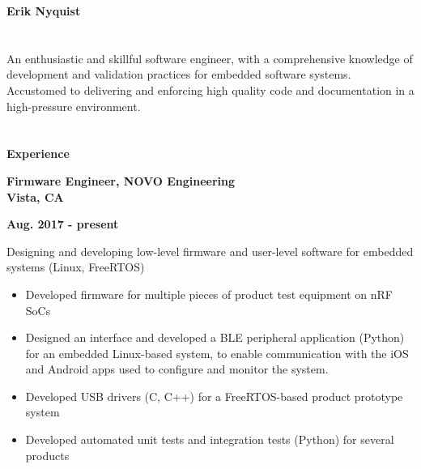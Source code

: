 \documentclass[6pt]{article}
\begin{document}
\centerline{\Huge \bfseries Erik Nyquist}
\section*{}

An enthusiastic and skillful software engineer, with a comprehensive knowledge of
development and validation practices for embedded software systems. Accustomed to
delivering and enforcing high quality code and documentation in a high-pressure
environment.

\section*{}
{\Large \bfseries Experience}
\break

\hspace*{-\parindent}%
\begin{minipage}{20em}
{\bfseries Firmware Engineer, NOVO Engineering \\
Vista, CA}
\end{minipage}
\hfill
\begin{minipage}{10em}
{
    \bfseries \hfill Aug. 2017 - present \\

}
\end{minipage}
\break
\break
Designing and developing low-level firmware and user-level software for embedded
systems (Linux, FreeRTOS)
\begin{itemize}
    \item Developed firmware for multiple pieces of product test equipment on nRF SoCs
    \item Designed an interface and developed a BLE peripheral application (Python) for an
          embedded Linux-based system, to enable communication with the iOS and Android
          apps used to configure and monitor the system.
    \item Developed USB drivers (C, C++) for a FreeRTOS-based product prototype system
    \item Developed automated unit tests and integration tests (Python) for several products
\end{itemize}
\end{document}
